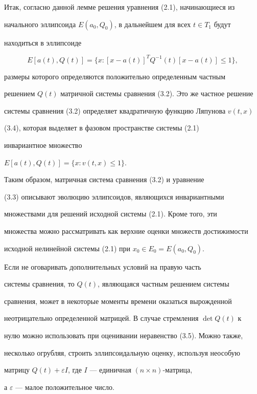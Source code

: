  


Итак, согласно данной лемме решения уравнения (2.1), начинающиеся из 


начального эллипсоида $E(a_0,Q_0)$, в дальнейшем для всех $t\in T_1$ будут 


находиться в эллипсоиде 


$$ 


E[a(t),Q(t)]=\{x:[x-a(t)]^T Q^{-1}(t)[x-a(t)]\le1\}, 


$$ 


размеры которого определяются положительно определенным частным 


решением $Q(t)$ матричной системы сравнения (3.2). Это же частное решение 


системы сравнения (3.2) определяет квадратичную функцию Ляпунова $v(t,x)$ 


(3.4), которая выделяет в фазовом пространстве системы (2.1) 


инвариантное множество 


$E[a(t),Q(t)]=\{x:v(t,x)\le1\}$. 


Таким образом, матричная система сравнения (3.2) и уравнение


(3.3) описывают эволюцию эллипсоидов, являющихся инвариантными 


множествами для решений исходной системы (2.1). Кроме того, эти 


множества можно рассматривать как верхние оценки множеств достижимости 


исходной нелинейной системы (2.1) при $x_0\in E_0=E(a_0,Q_0)$. 


 


\begin{note} 


Если не оговаривать дополнительных условий на правую часть 


системы сравнения, то $Q(t)$, являющаяся частным решением системы 


сравнения, может в некоторые моменты времени оказаться вырожденной 


неотрицательно определенной матрицей. В случае стремления $\det Q(t)$ к 


нулю можно использовать при оценивании неравенство (3.5). Можно также, 


несколько огрубляя, строить эллипсоидальную оценку, используя неособую 


матрицу $Q(t)+\varepsilon I$, где $I$ --- единичная $(n\times n)$-матрица, 


а $\varepsilon$ --- малое положительное число. 


\end{note} 


